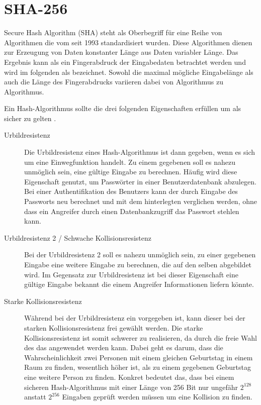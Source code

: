 \chapter{SHA-256}
\label{chp:sha256}

Secure Hash Algorithm (SHA) steht als Oberbegriff für eine Reihe von Algorithmen die vom  seit 1993 standardisiert wurden.
Diese Algorithmen dienen zur Erzeugung von Daten konstanter Länge aus Daten variabler Länge.
Das Ergebnis kann als ein Fingerabdruck der Eingabedaten betrachtet werden und wird im folgenden als  bezeichnet.
Sowohl die maximal mögliche Eingabelänge als auch die Länge des Fingerabdrucks variieren dabei von Algorithmus zu Algorithmus.

Ein Hash-Algorithmus sollte die drei folgenden Eigenschaften erfüllen um als sicher zu gelten \cite{crypto1}.
\begin{description}
  \item[Urbildresistenz] Die Urbildresistenz eines Hash-Algorithmus ist dann gegeben, wenn es sich um eine Einwegfunktion handelt.
                         Zu einem gegebenen  soll es nahezu unmöglich sein, eine gültige Eingabe zu berechnen.
                         Häufig wird diese Eigenschaft genutzt, um Passwörter in einer Benutzerdatenbank abzulegen.
                         Bei einer Authentifikation des Benutzers kann der  durch Eingabe des Passworts neu berechnet und mit dem 
                         hinterlegten  verglichen werden, ohne dass ein Angreifer durch einen Datenbankzugriff das Passwort stehlen kann.
  \item[Urbildresistenz 2 / Schwache Kollisionsresistenz]
                         Bei der Urbildresistenz 2 soll es nahezu unmöglich sein, zu einer gegebenen Eingabe eine weitere Eingabe zu berechnen,
                         die auf den selben  abgebildet wird. Im Gegensatz zur Urbildresistenz ist bei dieser Eigenschaft eine gültige
                         Eingabe bekannt die einem Angreifer Informationen liefern könnte.
  \item[Starke Kollisionsresistenz]
                         Während bei der Urbildresistenz ein  vorgegeben ist, kann dieser bei der starken Kollisionsresistenz frei gewählt werden.
                         Die starke Kollisionsresistenz ist somit schwerer zu realisieren, da durch die freie Wahl des  das 
                         angewendet werden kann. Dabei geht es darum, dass die Wahrscheinlichkeit zwei Personen mit einem gleichen Geburtstag in einem Raum
                         zu finden, wesentlich höher ist, als zu einem gegebenen Geburtstag eine weitere Person zu finden. Konkret bedeutet das, dass
                         bei einem sicheren Hash-Algorithmus mit einer Länge von 256 Bit nur ungefähr $ 2^{128} $ anstatt $ 2^{256} $ Eingaben geprüft werden
                         müssen um eine Kollision zu finden.                         
\end{description}

